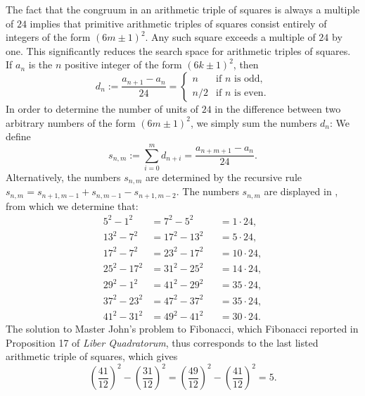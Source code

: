 The fact that the congruum in an arithmetic triple of squares is always a multiple of $24$ implies that primitive arithmetic triples of squares consist entirely of integers of the form $(6m\pm 1)^2$. Any such square exceeds a multiple of $24$ by one. This significantly reduces the search space for arithmetic triples of squares. If $a_n$ is the $n$\supth{} positive integer of the form $(6k\pm 1)^2$, then
\begin{equation*}
  d_n:=\frac{a_{n+1}-a_n}{24}=
  \begin{cases}
    n & \text{if $n$ is odd,}\\
    n/2 & \text{if $n$ is even.}
  \end{cases}
\end{equation*}
In order to determine the number of units of $24$ in the difference between two arbitrary numbers of the form $(6m\pm 1)^2$, we simply sum the numbers $d_n$: We define
\begin{equation*}
  s_{n,m}:=\sum_{i=0}^md_{n+i}=\frac{a_{n+m+1}-a_n}{24}.
\end{equation*}
Alternatively, the numbers $s_{n,m}$ are determined by the recursive rule $s_{n,m}=s_{n+1,m-1}+s_{n,m-1}-s_{n+1,m-2}$.
The numbers $s_{n,m}$ are displayed in , from which we determine that:
    \begin{align*}
      5^2-1^2 & = 7^2-5^2 & & = 1\cdot 24, \\
      13^2 - 7^2 & = 17^2 - 13^2 & & = 5\cdot 24, \\
      17^2 - 7^2 & = 23^2 - 17^2 & & = 10\cdot 24, \\
      25^2 - 17^2 & = 31^2 - 25^2 & & = 14\cdot 24, \\ 
      29^2 - 1^2 & = 41^2 - 29^2 & & = 35\cdot 24, \\
      37^2 - 23^2 & = 47^2 - 37^2 & & = 35\cdot 24, \\
      41^2 - 31^2 & = 49^2 - 41^2 & & = 30\cdot 24.
    \end{align*}
The solution to Master John's problem to Fibonacci, which Fibonacci reported in Proposition 17 of \emph{Liber Quadratorum}, thus corresponds to the last listed arithmetic triple of squares, which gives
\begin{equation*}
  \left(\frac{41}{12}\right)^2-\left(\frac{31}{12}\right)^2=\left(\frac{49}{12}\right)^2-\left(\frac{41}{12}\right)^2=5.
\end{equation*}


